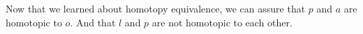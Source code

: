 \documentclass[
	fontsize=10pt, %
	twoside=false, %
	secnumdepth=1, %
]{kaobook}
\begin{document}
 Now that we learned about homotopy equivalence, we can assure that $p$ and $a$ are homotopic to $o.$ And that $l$ and $p$ are not homotopic to each other.
 
 
%
%
%


\end{document}
